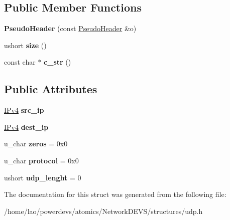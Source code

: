 \subsection*{Public Member Functions}
\begin{DoxyCompactItemize}
\item 
{\bfseries Pseudo\+Header} (const \hyperlink{structudp_1_1PseudoHeader}{Pseudo\+Header} \&o)\hypertarget{structudp_1_1PseudoHeader_a16395f2d397c61eb38d6b6ead67137c0}{}\label{structudp_1_1PseudoHeader_a16395f2d397c61eb38d6b6ead67137c0}

\item 
ushort {\bfseries size} ()\hypertarget{structudp_1_1PseudoHeader_a13d65dbc9db37dce995b37d5aacaaa36}{}\label{structudp_1_1PseudoHeader_a13d65dbc9db37dce995b37d5aacaaa36}

\item 
const char $\ast$ {\bfseries c\+\_\+str} ()\hypertarget{structudp_1_1PseudoHeader_a89fa524fdc3fe6c2cf151e5c31c1bbcc}{}\label{structudp_1_1PseudoHeader_a89fa524fdc3fe6c2cf151e5c31c1bbcc}

\end{DoxyCompactItemize}
\subsection*{Public Attributes}
\begin{DoxyCompactItemize}
\item 
\hyperlink{structIPv4}{I\+Pv4} {\bfseries src\+\_\+ip}\hypertarget{structudp_1_1PseudoHeader_aafc5eb8cfafb7ce922e1678c359f55bb}{}\label{structudp_1_1PseudoHeader_aafc5eb8cfafb7ce922e1678c359f55bb}

\item 
\hyperlink{structIPv4}{I\+Pv4} {\bfseries dest\+\_\+ip}\hypertarget{structudp_1_1PseudoHeader_abebb8b9c17774287930affd0c3c471a8}{}\label{structudp_1_1PseudoHeader_abebb8b9c17774287930affd0c3c471a8}

\item 
u\+\_\+char {\bfseries zeros} = 0x0\hypertarget{structudp_1_1PseudoHeader_a51cdc408b4e23b6d8dc3d835dcef9291}{}\label{structudp_1_1PseudoHeader_a51cdc408b4e23b6d8dc3d835dcef9291}

\item 
u\+\_\+char {\bfseries protocol} = 0x0\hypertarget{structudp_1_1PseudoHeader_adcacf0d1e8481cd171121f3668f7c240}{}\label{structudp_1_1PseudoHeader_adcacf0d1e8481cd171121f3668f7c240}

\item 
ushort {\bfseries udp\+\_\+lenght} = 0\hypertarget{structudp_1_1PseudoHeader_adc2636cd18c48abaadc658453ff1b019}{}\label{structudp_1_1PseudoHeader_adc2636cd18c48abaadc658453ff1b019}

\end{DoxyCompactItemize}


The documentation for this struct was generated from the following file\+:\begin{DoxyCompactItemize}
\item 
/home/lao/powerdevs/atomics/\+Network\+D\+E\+V\+S/structures/udp.\+h\end{DoxyCompactItemize}
